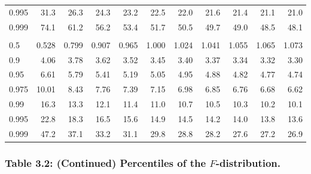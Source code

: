 \documentclass[]{article}
\begin{document}
\begin{table}[H]
\begin{tabular}{lrrrrrrrrrr}
\hspace{1em}0.995 & 31.3 & 26.3 & 24.3 & 23.2 & 22.5 & 22.0 & 21.6 & 21.4 & 21.1 & 21.0\\
\hspace{1em}0.999 & 74.1 & 61.2 & 56.2 & 53.4 & 51.7 & 50.5 & 49.7 & 49.0 & 48.5 & 48.1\\
\addlinespace[0.3em]
\multicolumn{11}{l}{\textbf{$k_2=5$}}\\
\hspace{1em}0.5 & 0.528 & 0.799 & 0.907 & 0.965 & 1.000 & 1.024 & 1.041 & 1.055 & 1.065 & 1.073\\
\hspace{1em}0.9 & 4.06 & 3.78 & 3.62 & 3.52 & 3.45 & 3.40 & 3.37 & 3.34 & 3.32 & 3.30\\
\hspace{1em}0.95 & 6.61 & 5.79 & 5.41 & 5.19 & 5.05 & 4.95 & 4.88 & 4.82 & 4.77 & 4.74\\
\hspace{1em}0.975 & 10.01 & 8.43 & 7.76 & 7.39 & 7.15 & 6.98 & 6.85 & 6.76 & 6.68 & 6.62\\
\hspace{1em}0.99 & 16.3 & 13.3 & 12.1 & 11.4 & 11.0 & 10.7 & 10.5 & 10.3 & 10.2 & 10.1\\
\hspace{1em}0.995 & 22.8 & 18.3 & 16.5 & 15.6 & 14.9 & 14.5 & 14.2 & 14.0 & 13.8 & 13.6\\
\hspace{1em}0.999 & 47.2 & 37.1 & 33.2 & 31.1 & 29.8 & 28.8 & 28.2 & 27.6 & 27.2 & 26.9\\
\bottomrule
\end{tabular}
\end{table}

\hypertarget{table-3.2-continued-percentiles-of-the-f-distribution.}{%
\subsubsection{\texorpdfstring{Table 3.2: (Continued) Percentiles of the
\(F\)-distribution.}{Table 3.2: (Continued) Percentiles of the F-distribution.}}\label{table-3.2-continued-percentiles-of-the-f-distribution.}}
\end{document}
